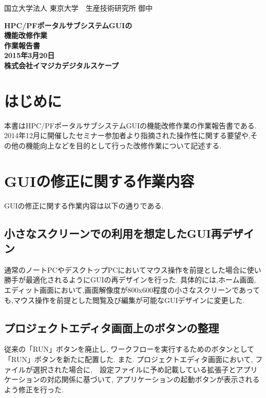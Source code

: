 \documentclass[a4paper,10pt,oneside]{jsbook}
\begin{document}
\begin{titlepage}
\noindent
国立大学法人 東京大学　生産技術研究所 御中
\begin{center}
	\vspace{8cm}
	{\Huge \textbf{HPC/PFポータルサブシステムGUIの\\機能改修作業} } \\
	\vspace{1cm}
	{\Huge \textbf{作業報告書}} \\
	\vspace{10cm}
	{\Large \textbf{2015年3月20日}} \\
	\vspace{0.5cm}
	{\Large \textbf{株式会社イマジカデジタルスケープ}}
\end{center}
\end{titlepage}

\tableofcontents

\chapter{はじめに}
本書はHPC/PFポータルサブシステムGUIの機能改修作業の作業報告書である.
2014年12月に開催したセミナー参加者より指摘された操作性に関する要望や,その他の機能向上などを目的として行った改修作業について記述する.

\chapter{GUIの修正に関する作業内容}
GUIの修正に関する作業内容は以下の通りである.

\section{小さなスクリーンでの利用を想定したGUI再デザイン}
通常のノートPCやデスクトップPCにおいてマウス操作を前提とした場合に使い勝手が最適化されるようにGUIの再デザインを行った.
具体的には,ホーム画面,エディット画面において,画面解像度が800x600程度の小さなスクリーンであっても,マウス操作を前提とした閲覧及び編集が可能なGUIデザインに変更した.

\section{プロジェクトエディタ画面上のボタンの整理}
\label{sec:projectbutton}
従来の「RUN」ボタンを廃止し, ワークフローを実行するためのボタンとして「RUN」ボタンを新たに配置した. また. プロジェクトエディタ画面において, ファイルが選択された場合に,　設定ファイルに予め記載している拡張子とアプリケーションの対応関係に基づいて, アプリケーションの起動ボタンが表示されるよう修正を行った.
\end{document}
